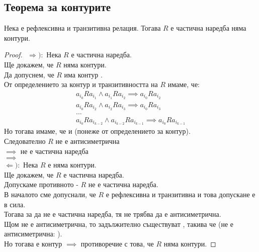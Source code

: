 \begin{example}
    
\end{example}

\subsection*{Теорема за контурите}
\begin{theorem}
    Нека  е рефлексивна и транзитивна релация. Тогава \(R\) е частична наредба 
    \totw няма контури.

    \begin{proof}
        $ $\newline
        \(\Rightarrow):\) Нека \(R\) е частична наредба. \\
        Ще докажем, че \(R\) няма контури. \\
        Да допуснем, че \(R\) има контур . \\
        От определението за контур и транзитивността на \(R\) имаме, че: 
        \begin{align*}
            a_{i_0}Ra_{i_1} \land a_{i_1}Ra_{i_2} \implies a_{i_0}Ra_{i_2} \\
            a_{i_0}Ra_{i_2} \land a_{i_2}Ra_{i_3} \implies a_{i_0}Ra_{i_3} \\
            \dots \\ 
            a_{i_0}Ra_{i_{k - 2}} \land a_{i_{k - 2}}Ra_{i_{k - 1}} \implies a_{i_0}Ra_{i_{k - 1}}
        \end{align*}
        Но тогава имаме, че  и  (понеже  от 
        определението за контур). \\
        Следователно \(R\) не е антисиметрична \\ \(\implies\) не е частична наредба \\ \(\implies \) \lightning \\
        
        \(\Leftarrow):\) Нека \(R\) е няма контури. \\
        Ще докажем, че \(R\) е частична наредба. \\
        Допускаме противното - \(R\) не е частична наредба. \\
        В началото сме допуснали, че \(R\) е рефлексивна и транзитивна и това допускане е в сила. \\
        Тогава за да не е частична наредба, тя не трябва да е антисиметрична. \\
        Щом не е антисиметрична, то задължително съществуват , такива че 
         (не е антисиметрична: ). \\
        Но тогава  е контур \(\implies\) противоречие с това, 
        че \(R\) няма контури.
    \end{proof}
\end{theorem}

